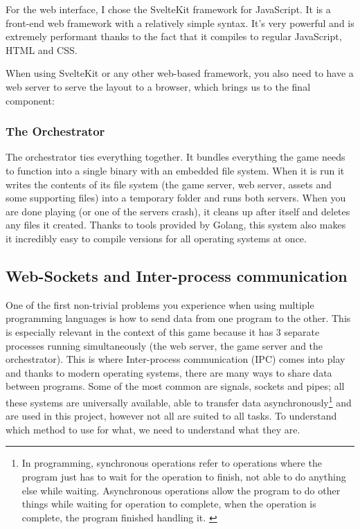 For the web interface, I chose the SvelteKit framework for JavaScript. It is a front-end web framework with a relatively simple syntax. It's very
powerful and is extremely performant thanks to the fact that it compiles to regular JavaScript, HTML and CSS.

When using SvelteKit or any other web-based framework, you also need to have a web server to serve the layout to a
browser, which brings us to the final component:

\subsubsection{The Orchestrator}

The orchestrator ties everything together. It bundles everything the game needs to function into a single binary with an
embedded file system. When it is run it writes the contents of its file system (the game server, web server, assets and
some supporting files) into a temporary folder and runs both servers. When you are done playing (or one of the servers
crash), it cleans up after itself and deletes any files it created. Thanks to tools provided by Golang, this system
also makes it incredibly easy to compile versions for all operating systems at once.

\subsection{Web-Sockets and Inter-process communication}
\label{subsec:ipc}

One of the first non-trivial problems you experience when using multiple programming languages is how to send data from
one program to the other. This is especially relevant in the context of this game because it has 3 separate processes
running simultaneously (the web server, the game server and the orchestrator).  This is where Inter-process communication (IPC) comes into
play and thanks to modern operating systems, there are many ways to share data between programs. Some of the most common
are signals, sockets and pipes; all these systems are universally available, able to transfer data asynchronously\footnote{
	In programming, synchronous operations refer to operations where the program just has to wait for the operation to finish,
	not able to do anything else while waiting. Asynchronous operations allow the program to do other things while waiting for
	operation to complete, when the operation is complete, the program finished handling it. \label{footnote:async}
} and are used in this project, however not all are suited to all tasks. To understand which method to use for what, we need to understand
what they are.

